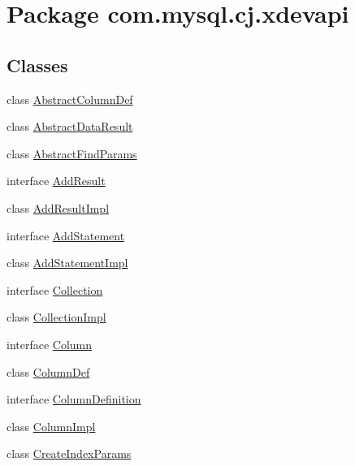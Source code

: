 \hypertarget{namespacecom_1_1mysql_1_1cj_1_1xdevapi}{}\section{Package com.\+mysql.\+cj.\+xdevapi}
\label{namespacecom_1_1mysql_1_1cj_1_1xdevapi}
\subsection*{Classes}
\begin{DoxyCompactItemize}
\item 
class \mbox{\hyperlink{classcom_1_1mysql_1_1cj_1_1xdevapi_1_1_abstract_column_def}{Abstract\+Column\+Def}}
\item 
class \mbox{\hyperlink{classcom_1_1mysql_1_1cj_1_1xdevapi_1_1_abstract_data_result}{Abstract\+Data\+Result}}
\item 
class \mbox{\hyperlink{classcom_1_1mysql_1_1cj_1_1xdevapi_1_1_abstract_find_params}{Abstract\+Find\+Params}}
\item 
interface \mbox{\hyperlink{interfacecom_1_1mysql_1_1cj_1_1xdevapi_1_1_add_result}{Add\+Result}}
\item 
class \mbox{\hyperlink{classcom_1_1mysql_1_1cj_1_1xdevapi_1_1_add_result_impl}{Add\+Result\+Impl}}
\item 
interface \mbox{\hyperlink{interfacecom_1_1mysql_1_1cj_1_1xdevapi_1_1_add_statement}{Add\+Statement}}
\item 
class \mbox{\hyperlink{classcom_1_1mysql_1_1cj_1_1xdevapi_1_1_add_statement_impl}{Add\+Statement\+Impl}}
\item 
interface \mbox{\hyperlink{interfacecom_1_1mysql_1_1cj_1_1xdevapi_1_1_collection}{Collection}}
\item 
class \mbox{\hyperlink{classcom_1_1mysql_1_1cj_1_1xdevapi_1_1_collection_impl}{Collection\+Impl}}
\item 
interface \mbox{\hyperlink{interfacecom_1_1mysql_1_1cj_1_1xdevapi_1_1_column}{Column}}
\item 
class \mbox{\hyperlink{classcom_1_1mysql_1_1cj_1_1xdevapi_1_1_column_def}{Column\+Def}}
\item 
interface \mbox{\hyperlink{interfacecom_1_1mysql_1_1cj_1_1xdevapi_1_1_column_definition}{Column\+Definition}}
\item 
class \mbox{\hyperlink{classcom_1_1mysql_1_1cj_1_1xdevapi_1_1_column_impl}{Column\+Impl}}
\item 
class \mbox{\hyperlink{classcom_1_1mysql_1_1cj_1_1xdevapi_1_1_create_index_params}{Create\+Index\+Params}}

\end{DoxyCompactItemize}
